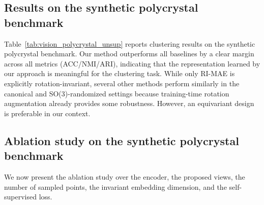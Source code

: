 \documentclass[runningheads]{llncs}
\begin{document}
\subsection{Results on the synthetic polycrystal benchmark}
\label{sec:results_synth}

Table~\ref{tab:vision_polycrystal_unsup} reports clustering results on the synthetic polycrystal benchmark. Our method outperforms all baselines by a clear margin across all metrics (ACC/NMI/ARI), indicating that the representation learned by our approach is meaningful for the clustering task. While only RI-MAE is explicitly rotation-invariant, several other methods perform similarly in the canonical and SO(3)-randomized settings because training-time rotation augmentation already provides some robustness. However, an equivariant design is preferable in our context.

\subsection{Ablation study on the synthetic polycrystal benchmark}
We now present the ablation study over the encoder, the proposed views, the number of sampled points, the invariant embedding dimension, and the self-supervised loss.
\end{document}

